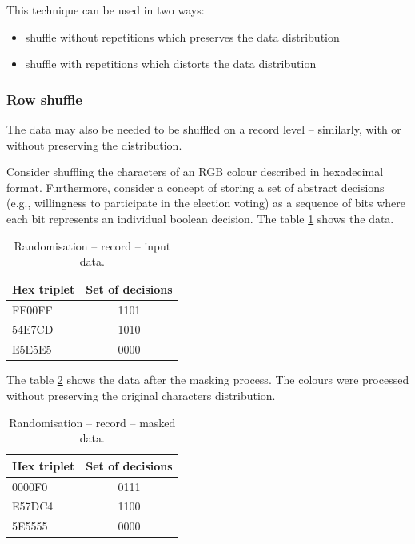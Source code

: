 \documentclass[a4paper,twoside,12pt]{book}
\begin{document}
This technique can be used in two ways:
\begin{itemize}
\item shuffle without repetitions which preserves the data distribution
\item shuffle with repetitions which distorts the data distribution
\end{itemize}

\subsubsection{Row shuffle}

The data may also be needed to be shuffled on a record level – similarly, with or without preserving the distribution.

Consider shuffling the characters of an RGB colour described in hexadecimal format. Furthermore, consider a concept of storing a set of abstract decisions (e.g., willingness to participate in the election voting) as a sequence of bits where each bit represents an individual boolean decision. The table \ref{id:tab:record_randomisation_raw} shows the data.

\begin{table}[h]
\centering
\caption{Randomisation – record – input data.}
\label{id:tab:record_randomisation_raw}
\begin{tabular}{lc}
\toprule
Hex triplet & Set of decisions \\ \midrule
FF00FF      & 1101             \\
54E7CD      & 1010             \\
E5E5E5      & 0000             \\ \bottomrule
\end{tabular}
\end{table}

The table \ref{id:tab:record_randomisation_masked} shows the data after the masking process. The colours were processed without preserving the original characters distribution.

\begin{table}[h]
\centering
\caption{Randomisation – record – masked data.}
\label{id:tab:record_randomisation_masked}
\begin{tabular}{lc}
\toprule
Hex triplet & Set of decisions \\ \midrule
0000F0      & 0111             \\
E57DC4      & 1100             \\
5E5555      & 0000             \\ \bottomrule
\end{tabular}
\end{table}
\end{document}
